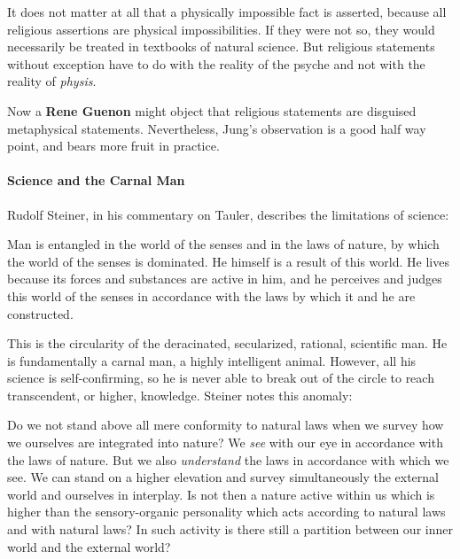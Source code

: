 \begin{quotex}
It does not matter at all that a physically impossible fact is asserted, because all religious assertions are physical impossibilities. If they were not so, they would necessarily be treated in textbooks of natural science. But religious statements without exception have to do with the reality of the psyche and not with the reality of \emph{physis}.
\end{quotex}


Now a \textbf{Rene Guenon} might object that religious statements are disguised metaphysical statements. Nevertheless, Jung's observation is a good half way point, and bears more fruit in practice.

\paragraph{Science and the Carnal Man}


Rudolf Steiner, in his commentary on Tauler, describes the limitations of science:

\begin{quotex}
Man is entangled in the world of the senses and in the laws of nature, by which the world of the senses is dominated. He himself is a result of this world. He lives because its forces and substances are active in him, and he perceives and judges this world of the senses in accordance with the laws by which it and he are constructed.
\end{quotex}


This is the circularity of the deracinated, secularized, rational, scientific man. He is fundamentally a carnal man, a highly intelligent animal. However, all his science is self-confirming, so he is never able to break out of the circle to reach transcendent, or higher, knowledge. Steiner notes this anomaly:

\begin{quotex}
Do we not stand above all mere conformity to natural laws when we survey how we ourselves are integrated into nature? We \emph{see} with our eye in accordance with the laws of nature. But we also \emph{understand} the laws in accordance with which we see. We can stand on a higher elevation and survey simultaneously the external world and ourselves in interplay. Is not then a nature active within us which is higher than the sensory-organic personality which acts according to natural laws and with natural laws? In such activity is there still a partition between our inner world and the external world?
\end{quotex}


